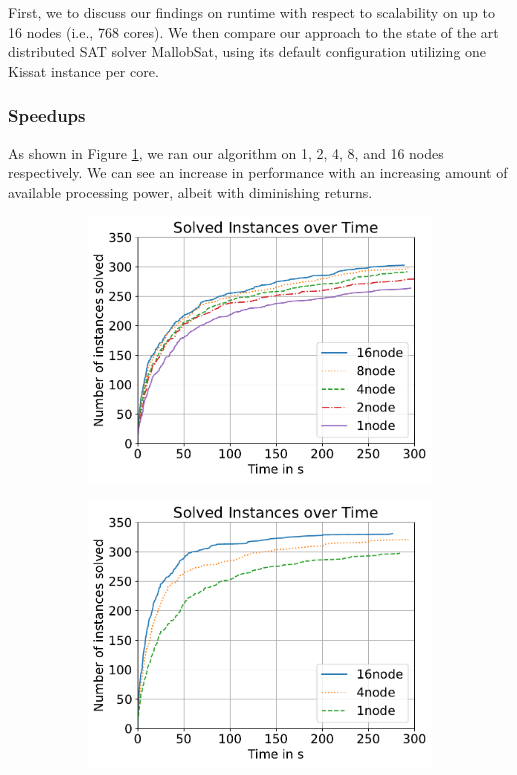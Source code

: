 \documentclass[12pt,a4paper,twoside]{scrartcl}
\numberwithin{equation}{section}
\begin{document}
First, we to discuss our findings on runtime with respect to scalability on up to 16 nodes (i.e., 768 cores). We then compare our approach to the state of the art distributed SAT solver MallobSat, using its default configuration utilizing one Kissat instance per core.

\subsubsection{Speedups}

As shown in Figure \ref{fig:runtimeCompareGim}, we ran our algorithm on 1, 2, 4, 8, and 16 nodes respectively. We can see an increase in performance with an increasing amount of available processing power, albeit with diminishing returns.

\begin{figure}[!h]
  \center
  \begin{subfigure}[c]{.45\textwidth}
    \center
    \includegraphics[scale=.45]{plots/cumulative_runtime/scalability_gim.pdf}
    \label{fig:runtimeCompareGim}
  \end{subfigure}
  \hfill
  \begin{subfigure}[c]{.45\textwidth}
    \center
    \includegraphics[scale=.45]{plots/cumulative_runtime/scalability_kis.pdf}

\end{subfigure}
\end{figure}
\end{document}
